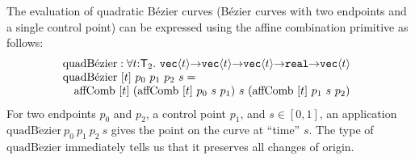 \begin{example}
  The evaluation of quadratic B\'{e}zier curves (B\'{e}zier curves
  with two endpoints and a single control point) can be expressed
  using the affine combination primitive as follows: %
  \begin{displaymath}
    \begin{array}{@{}l}
      \mathrm{quadB\acute{e}zier} : \forall t
      \mathord:\SynTransl{2}.\ \tyPrim{vec}{t} \mathord\to \tyPrim{vec}{t}\mathord\to
      \tyPrim{vec}{t} \mathord\to \tyPrimNm{real} \mathord\to \tyPrim{vec}{t}
      \\ \mathrm{quadB\acute{e}zier}\ [t]\ p_0\ p_1\ p_2\ s = \\ \quad
      \mathrm{affComb}\ [t]\ (\mathrm{affComb}\ [t]\ p_0\ s\ p_1)\ s\ (\mathrm{affComb}\ [t]\ p_1\ s\ p_2)
      \\
    \end{array}
  \end{displaymath}
  For two endpoints $p_0$ and $p_2$, a control point $p_1$, and $s \in
  [0,1]$, an application
  $\mathrm{quadB\acute{e}zier}\ p_0\ p_1\ p_2\ s$ gives the point on
  the curve at ``time'' $s$.  The type of
  $\mathrm{quadB\acute{e}zier}$ immediately tells us that it preserves
  all changes of origin.
\end{example}

